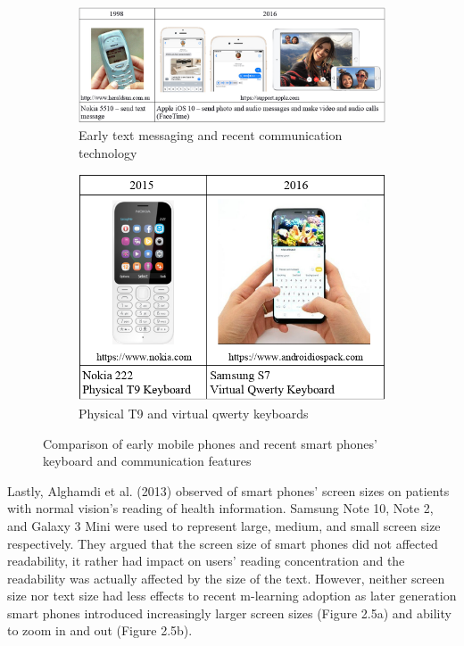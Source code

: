 \begin{figure}[!hbt]\centering
    \begin{subfigure}{1.0\textwidth}
\includegraphics[width=\textwidth]{cha5}
\caption{Early text messaging and recent communication technology}
    \end{subfigure}\hspace{0.1\textwidth}
 \begin{subfigure}{0.55\textwidth}
\includegraphics[width=\textwidth]{cha4}
\caption{Physical T9 and virtual qwerty keyboards}
 \end{subfigure}
  \caption{Comparison of early mobile phones and recent smart phones' keyboard and communication features}
\end{figure}

Lastly, Alghamdi et al. (2013) \cite{alghamdi2013impact}  observed of smart phones' screen sizes on patients with normal vision's reading of health information. Samsung Note 10, Note 2, and Galaxy 3 Mini were used to represent large, medium, and small screen size respectively. They argued that the screen size of smart phones did not affected readability, it rather had impact on users' reading concentration and the readability was actually affected by the size of the text. However, neither screen size nor text size had less effects to recent m-learning adoption as later generation smart phones introduced increasingly larger screen sizes (Figure 2.5a) and ability to zoom in and out (Figure 2.5b). 

